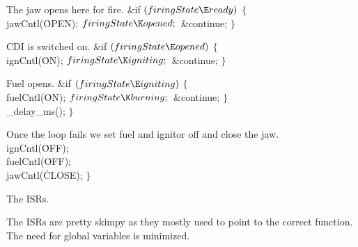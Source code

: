 The jaw opens here for fire.
\Y\B\&{if} ${}(\\{firingState}\E\\{ready}){}$\5
${}\{{}$\1\6
\\{jawCntl}(\.{OPEN});\6
${}\\{firingState}\K\\{opened};{}$\6
\&{continue};\6
\4${}\}{}$\2\par
\fi

CDI is switched on.
\Y\B\&{if} ${}(\\{firingState}\E\\{opened}){}$\5
${}\{{}$\1\6
\\{ignCntl}(\.{ON});\6
${}\\{firingState}\K\\{igniting};{}$\6
\&{continue};\6
\4${}\}{}$\2\par
\fi

Fuel opens.
\Y\B\&{if} ${}(\\{firingState}\E\\{igniting}){}$\5
${}\{{}$\1\6
\\{fuelCntl}(\.{ON});\6
${}\\{firingState}\K\\{burning};{}$\6
\&{continue};\6
\4${}\}{}$\2\6
\\{\_delay\_ms}(); $\}{}$\par
\fi

Once the loop fails we set fuel and ignitor off and close the jaw.
\Y\B\\{ignCntl}(\.{OFF});\6
\\{fuelCntl}(\.{OFF});\6
\\{jawCntl}(\.{CLOSE}); $\}{}$\par
\fi

The ISRs.

The ISRs are pretty skimpy as they mostly used to point 
to
the correct function.
The need for global variables is minimized.

\fi

